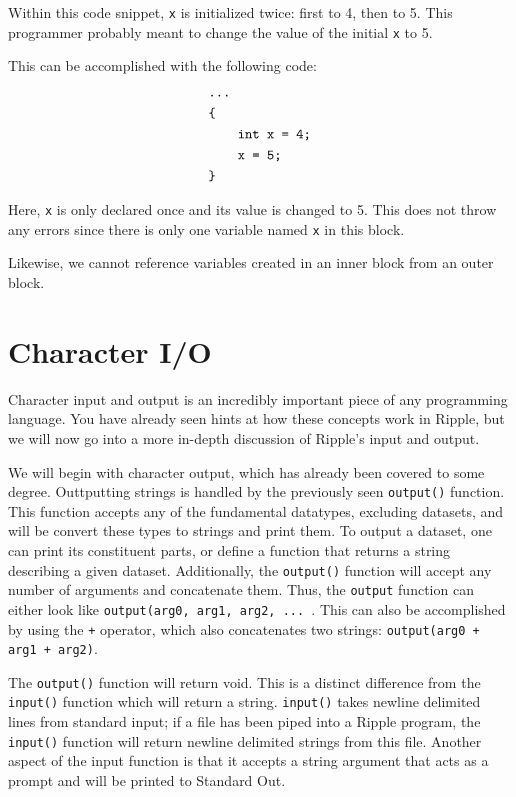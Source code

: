 \documentclass{article}
\newcommand{\code}{\texttt}
\begin{document}
Within this code snippet,  \code{x} is initialized twice: first to 4, then to 5. This programmer probably meant to change the value of the initial \code{x} to 5.

This can be accomplished with the following code:
\begin{align*}
& \code{\ldots}                   \\
& \code{\{}                       \\
& \code{\qquad int x = 4;}        \\
& \code{\qquad x = 5;} \\
& \code{\}}
\end{align*}

Here, \code{x} is only declared once and its value is changed to 5. This does not throw any errors since there is only one variable named \code{x} in this block. 

Likewise, we cannot reference variables created in an inner block from an outer block.

\section{Character I/O}
Character input and output is an incredibly important piece of any programming language. You have already seen hints at how these concepts work in Ripple, but we will now go into a more in-depth discussion of Ripple's input and output.
   
We will begin with character output, which has already been covered to some degree. Outtputting strings is handled by the previously seen \code{output()} function. This function accepts any of the fundamental datatypes, excluding datasets, and will be convert these types to strings and print them. To output a dataset, one can print its constituent parts, or define a function that returns a string describing a given dataset. Additionally, the \code{output()} function will accept any number of arguments and concatenate them. Thus, the \code{output} function can either look like \code{output(arg0, arg1, arg2, ... }. This can also be accomplished by using the \code{+} operator, which also concatenates two strings: \code{output(arg0 + arg1 + arg2)}. 

The \code{output()} function will return void. This is a distinct difference from the \code{input()} function which will return a string. \code{input()} takes newline delimited lines from standard input; if a file has been piped into a Ripple program, the \code{input()} function will return newline delimited strings from this file. Another aspect of the input function is that it accepts a string argument that acts as a prompt and will be printed to Standard Out.
\end{document}
